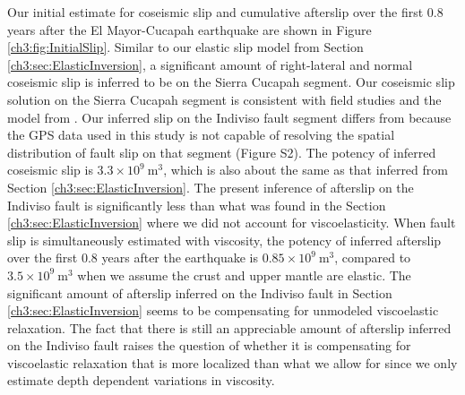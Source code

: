 Our initial estimate for coseismic slip and cumulative afterslip over the first 0.8 years after the El Mayor-Cucapah earthquake are shown in Figure \ref{ch3:fig:InitialSlip}.  Similar to our elastic slip model from Section \ref{ch3:sec:ElasticInversion}, a significant amount of right-lateral and normal coseismic slip is inferred to be on the Sierra Cucapah segment. Our coseismic slip solution on the Sierra Cucapah segment is consistent with field studies \citep{Fletcher2014} and the model from \citet{Wei2011}.  Our inferred slip on the Indiviso fault segment differs from \citet{Wei2011} because the GPS data used in this study is not capable of resolving the spatial distribution of fault slip on that segment (Figure S2).  The potency of inferred coseismic slip is $3.3\times 10^{9}\ \mathrm{m}^3$, which is also about the same as that inferred from Section \ref{ch3:sec:ElasticInversion}. The present inference of afterslip on the Indiviso fault is significantly less than what was found in the Section \ref{ch3:sec:ElasticInversion} where we did not account for viscoelasticity. When fault slip is simultaneously estimated with viscosity, the potency of inferred afterslip over the first 0.8 years after the earthquake is $0.85\times 10^9\ \mathrm{m}^3$, compared to $3.5\times10^{9}\ \mathrm{m}^3$ when we assume the crust and upper mantle are elastic.  The significant amount of afterslip inferred on the Indiviso fault in Section \ref{ch3:sec:ElasticInversion} seems to be compensating for unmodeled viscoelastic relaxation.  The fact that there is still an appreciable amount of afterslip inferred on the Indiviso fault raises the question of whether it is compensating for viscoelastic relaxation that is more localized than what we allow for since we only estimate depth dependent variations in viscosity.

